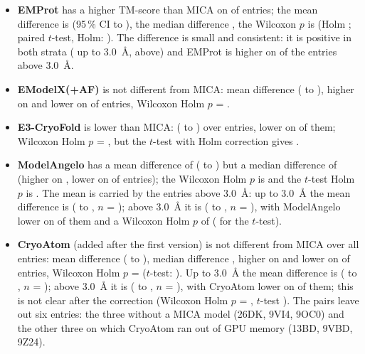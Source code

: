 \begin{itemize}
\item \textbf{EMProt} has a higher TM-score than MICA on \HigherTmEmprot{} of \NPairsTmEmprot{} entries; the mean difference is \DiffTmEmprot{} (95\,\% CI \DiffLoTmEmprot{} to \DiffHiTmEmprot{}), the median difference \MedDiffTmEmprot{}, the Wilcoxon $p$ is \PwTmEmprot{} (Holm \PwHolmTmEmprot{}; paired $t$-test, Holm: \PtHolmTmEmprot{}). The difference is small and consistent: it is positive in both strata (\DiffTmEmprotLow{} up to 3.0~\AA{}, \DiffTmEmprotHigh{} above) and EMProt is higher on \HigherTmEmprotHigh{} of the \NPairsTmEmprotHigh{} entries above 3.0~\AA{}.
\item \textbf{EModelX(+AF)} is not different from MICA: mean difference \DiffTmEmodelx{} (\DiffLoTmEmodelx{} to \DiffHiTmEmodelx{}), higher on \HigherTmEmodelx{} and lower on \LowerTmEmodelx{} of \NPairsTmEmodelx{} entries, Wilcoxon Holm $p$ = \PwHolmTmEmodelx{}.
\item \textbf{E3-CryoFold} is lower than MICA: \DiffTmEthree{} (\DiffLoTmEthree{} to \DiffHiTmEthree{}) over \NPairsTmEthree{} entries, lower on \LowerTmEthree{} of them; Wilcoxon Holm $p$ = \PwHolmTmEthree{}, but the $t$-test with Holm correction gives \PtHolmTmEthree{}.
\item \textbf{ModelAngelo} has a mean difference of \DiffTmAngelo{} (\DiffLoTmAngelo{} to \DiffHiTmAngelo{}) but a median difference of \MedDiffTmAngelo{} (higher on \HigherTmAngelo{}, lower on \LowerTmAngelo{} of \NPairsTmAngelo{} entries); the Wilcoxon Holm $p$ is \PwHolmTmAngelo{} and the $t$-test Holm $p$ is \PtHolmTmAngelo{}. The mean is carried by the entries above 3.0~\AA{}: up to 3.0~\AA{} the mean difference is \DiffTmAngeloLow{} (\DiffLoTmAngeloLow{} to \DiffHiTmAngeloLow{}, $n$ = \NPairsTmAngeloLow{}); above 3.0~\AA{} it is \DiffTmAngeloHigh{} (\DiffLoTmAngeloHigh{} to \DiffHiTmAngeloHigh{}, $n$ = \NPairsTmAngeloHigh{}), with ModelAngelo lower on \LowerTmAngeloHigh{} of them and a Wilcoxon Holm $p$ of \PwHolmTmAngeloHigh{} (\PtHolmTmAngeloHigh{} for the $t$-test).
\item \textbf{CryoAtom} (added after the first version) is not different from MICA over all entries: mean difference \DiffTmCryoatom{} (\DiffLoTmCryoatom{} to \DiffHiTmCryoatom{}), median difference \MedDiffTmCryoatom{}, higher on \HigherTmCryoatom{} and lower on \LowerTmCryoatom{} of \NPairsTmCryoatom{} entries, Wilcoxon Holm $p$ = \PwHolmTmCryoatom{} ($t$-test: \PtHolmTmCryoatom{}). Up to 3.0~\AA{} the mean difference is \DiffTmCryoatomLow{} (\DiffLoTmCryoatomLow{} to \DiffHiTmCryoatomLow{}, $n$ = \NPairsTmCryoatomLow{}); above 3.0~\AA{} it is \DiffTmCryoatomHigh{} (\DiffLoTmCryoatomHigh{} to \DiffHiTmCryoatomHigh{}, $n$ = \NPairsTmCryoatomHigh{}), with CryoAtom lower on \LowerTmCryoatomHigh{} of them; this is not clear after the correction (Wilcoxon Holm $p$ = \PwHolmTmCryoatomHigh{}, $t$-test \PtHolmTmCryoatomHigh{}). The \NPairsTmCryoatom{} pairs leave out six entries: the three without a MICA model (26DK, 9VI4, 9OC0) and the other three on which CryoAtom ran out of GPU memory (13BD, 9VBD, 9Z24).

\end{itemize}
